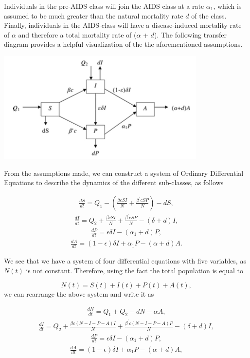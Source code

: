 Individuals in the pre-AIDS class will join the AIDS class at a rate $\alpha_{1}$, which is assumed to be much greater than the natural mortality rate $d$ of the class. Finally, individuals in the AIDS-class will have a disease-induced mortality rate of $\alpha$ and therefore a total mortality rate of ($\alpha$ + $d$). The following transfer diagram provides a helpful visualization of the the aforementioned assumptions.

\begin{center}
	\includegraphics[scale=0.75]{HIV_Flow_Chart.png}
\end{center}

From the assumptions made, we can construct a system of Ordinary Differential Equations to describe the dynamics of the different sub-classes, as follows

\begin{align}
\frac{dS}{dt} = Q_{1} - \left(\frac{\beta cSI}{N} + \frac{\beta^{\prime} cSP}{N}\right) - dS,
\end{align}
\begin{align}
\frac{dI}{dt} = Q_{2} + \frac{\beta cSI}{N} + \frac{\beta^{\prime} cSP}{N} - (\delta + d)I,
\end{align}
\begin{align}
\frac{dP}{dt} = \epsilon\delta I - (\alpha_{1} + d)P,
\end{align}
\begin{align}
\frac{dA}{dt} = (1 - \epsilon)\delta I + \alpha_{1}P - (\alpha + d)A.
\end{align}

We see that we have a system of four differential equations with five variables, as $N(t)$ is not constant. Therefore, using the fact the total population is equal to

$$
N(t) = S(t) + I(t) + P(t) + A(t),
$$
we can rearrange the above system and write it as

\begin{align}
\frac{dN}{dt} = Q_{1} + Q_{2} -dN - \alpha A,
\end{align}
\begin{align}
\frac{dI}{dt} = Q_{2} + \frac{\beta c(N-I-P-A)I}{N} + \frac{\beta^{\prime} c(N-I-P-A)P}{N} - (\delta + d)I,
\end{align}
\begin{align}
\frac{dP}{dt} = \epsilon\delta I - (\alpha_{1} + d)P,
\end{align}
\begin{align}
\frac{dA}{dt} = (1 - \epsilon)\delta I + \alpha_{1}P - (\alpha + d)A,
\end{align}

